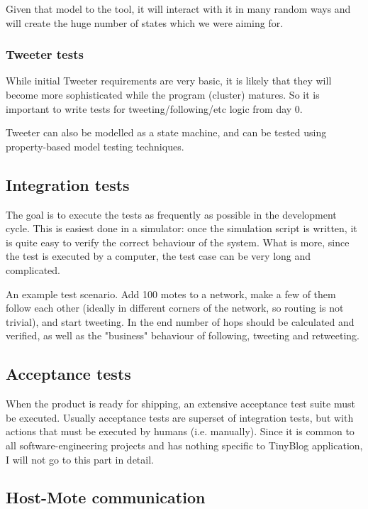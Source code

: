 \documentclass[english,11pt]{article}
\numberwithin{equation}{section}
\begin{document}
Given that model to the tool, it will interact with it in many random ways and
will create the huge number of states which we were aiming for.

\subsubsection{Tweeter tests}

While initial Tweeter requirements are very basic, it is likely that they will
become more sophisticated while the program (cluster) matures. So it is
important to write tests for tweeting/following/etc logic from day 0.

Tweeter can also be modelled as a state machine, and can be tested using
property-based model testing techniques.

\subsection{Integration tests}

The goal is to execute the tests as frequently as possible in the development
cycle. This is easiest done in a simulator: once the simulation script is
written, it is quite easy to verify the correct behaviour of the system. What is
more, since the test is executed by a computer, the test case can be very long
and complicated.

An example test scenario. Add 100 motes to a network, make a few of them follow
each other (ideally in different corners of the network, so routing is not
trivial), and start tweeting. In the end number of hops should be calculated and
verified, as well as the "business" behaviour of following, tweeting and
retweeting.

\subsection{Acceptance tests}

When the product is ready for shipping, an extensive acceptance test suite must
be executed. Usually acceptance tests are superset of integration tests, but
with actions that must be executed by humans (i.e. manually). Since it is common
to all software-engineering projects and has nothing specific to TinyBlog
application, I will not go to this part in detail.

\subsection{Host-Mote communication}
\end{document}
